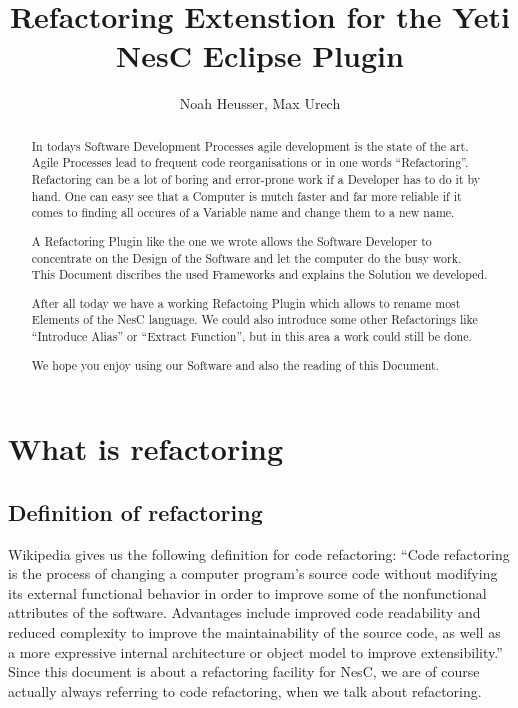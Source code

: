 \documentclass[a4paper,10pt]{report}
\title{Refactoring Extenstion for the Yeti NesC Eclipse Plugin}
\author{Noah Heusser, Max Urech}
\begin{document}
\maketitle

\begin{abstract}
In todays Software Development Processes agile development is the state of the art. Agile Processes lead to frequent code reorganisations or in one words ``Refactoring''.
Refactoring can be a lot of boring and error-prone work if a Developer has to do it by hand. One can easy see that a Computer is mutch faster and far more reliable if
it comes to finding all occures of a Variable name and change them to a new name.

A Refactoring Plugin like the one we wrote allows the Software Developer to concentrate on the Design of the Software and let the computer do the busy work. This Document
discribes the used Frameworks and explains the Solution we developed.

After all today we have a working Refactoing Plugin which allows to rename most Elements of the NesC language. We could also introduce some other Refactorings like 
``Introduce Alias'' or ``Extract Function'', but in this area a work could still be done.

We hope you enjoy using our Software and also the reading of this Document. 
\end{abstract}

\tableofcontents

\part{What is refactoring}
\chapter{Definition of refactoring}
Wikipedia gives us the following definition for code refactoring:
``Code refactoring is the process of changing a computer program's source code without modifying its external functional behavior in order to improve some of the nonfunctional attributes of the software. 
Advantages include improved code readability  and reduced complexity to improve the maintainability of the source code, as well as a more expressive internal architecture or object model to improve extensibility.''
Since this document is about a refactoring facility for NesC, we are of course actually always referring to code refactoring, when we talk about refactoring.
\end{document}
